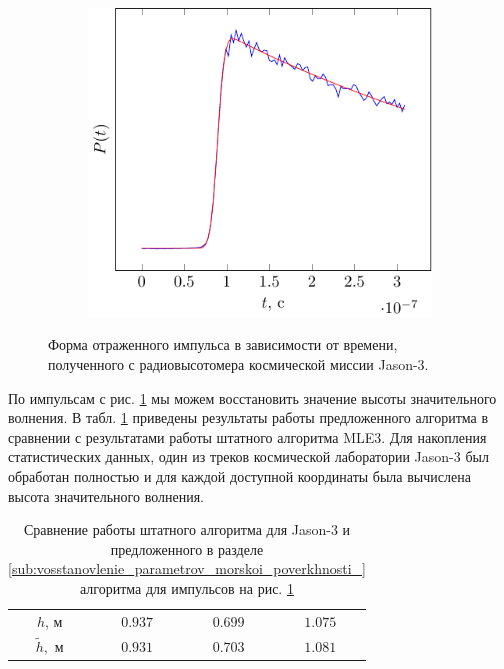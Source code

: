\begin{figure}[ht]
\begin{subfigure}{0.49\linewidth}
    \end{subfigure}
    \begin{subfigure}{0.49\linewidth}
        \centering
        \includegraphics[width=\linewidth, page=3]{fig/retracking/real}
    \end{subfigure}
    \caption{Форма отраженного импульса в зависимости от времени, полученного с
    радиовысотомера космической миссии Jason-3.}
    \label{fig:impulse_jason}
\end{figure}

По импульсам с рис. \ref{fig:impulse_jason} мы можем восстановить значение
высоты значительного волнения. В табл. \ref{tab:real} приведены результаты
работы предложенного алгоритма в сравнении с результатами работы штатного
алгоритма MLE3. Для накопления
статистических данных, один из треков космической лаборатории Jason-3 был
обработан полностью и для каждой доступной координаты была вычислена
высота значительного волнения. 
\begin{table}[h]
    \centering
    \caption{Сравнение работы штатного алгоритма для Jason-3 и предложенного в
    разделе \ref{sub:vosstanovlenie_parametrov_morskoi_poverkhnosti_} алгоритма
для импульсов на рис. \ref{fig:impulse_jason}}
    \label{tab:real} 
    \begin{tabular}{|c|c|c|c|}
        \hline
        $h$, м      & $0.937 $ & $0.699$ & $1.075$ \\
        $\tilde h,$ м & $0.931$ & $0.703$ & $1.081$ \\
        \hline
    \end{tabular}
\end{table}

